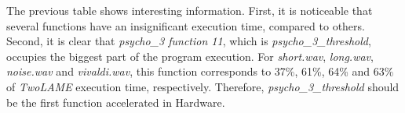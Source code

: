 \documentclass{article}
\begin{document}
\vspace{1cm}

The previous table shows interesting information. First, it is noticeable that several functions have an insignificant execution time, compared to others. Second, it is clear that \textit{psycho\_3 function 11}, which is \textit{psycho\_3\_threshold}, occupies the biggest part of the program execution. For \textit{short.wav}, \textit{long.wav}, \textit{noise.wav} and \textit{vivaldi.wav}, this function corresponds to 37\%, 61\%, 64\% and 63\% of \textit{TwoLAME} execution time, respectively.
Therefore, \textit{psycho\_3\_threshold} should be the first function accelerated in Hardware.

\end{document}
